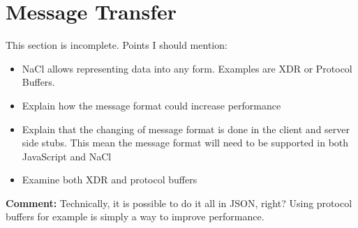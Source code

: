 \section{Message Transfer}
This section is incomplete. Points I should mention:

\begin{itemize}
	\item NaCl allows representing data into any form. Examples are XDR or Protocol Buffers.
	\item Explain how the message format could increase performance
	\item Explain that the changing of message format is done in the client and server side stubs. This mean the message format will need to be supported in both JavaScript and NaCl
	\item Examine both XDR and protocol buffers
\end{itemize}

\textbf{Comment: } Technically, it is possible to do it all in JSON, right? Using protocol buffers for example is simply a way to improve performance.

